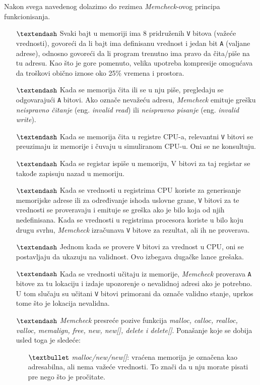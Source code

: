 \documentclass[12pt,oneside]{memoir}
\theoremstyle{plain}
\theoremstyle{definition}
\begin{document}
Nakon svega navedenog dolazimo do rezimea \textit{Memcheck}-ovog principa funkcionisanja.
\begin{itemize}
\item[$\textendash$] Svaki bajt u memoriji ima 8 pridruženih \texttt{V} bitova (važeće vrednosti), govoreći da li bajt ima definisanu vrednost i jedan bit \texttt{A} (valjane adrese), odnosno govoreći da li program trenutno ima pravo da čita/piše na tu adresu. Kao što je gore pomenuto, velika upotreba kompresije omogućava da troškovi obično iznose oko 25\% vremena i prostora.
\item[$\textendash$] Kada se memorija čita ili se u nju piše, pregledaju se odgovarajući \texttt{A} bitovi. Ako označe nevažeću adresu, \textit{Memcheck} emituje grešku \textit{neispravno čitanje} (eng. \textit{invalid read}) ili \textit{neispravno pisanje} (eng. \textit{invalid write}).
\item[$\textendash$] Kada se memorija čita u registre CPU-a, relevantni \texttt{V} bitovi se preuzimaju iz memorije i čuvaju u simuliranom CPU-u. Oni se ne konsultuju.
\item[$\textendash$] Kada se registar ispiše u memoriju, V bitovi za taj registar se takođe zapisuju nazad u memoriju.
\item[$\textendash$] Kada se vrednosti u registrima CPU koriste za generisanje memorijske adrese ili za određivanje ishoda uslovne grane, \texttt{V} bitovi za te vrednosti se proveravaju i emituje se greška ako je bilo koja od njih nedefinisana. Kada se vrednosti u registrima procesora koriste u bilo koju drugu svrhu, \textit{Memcheck} izračunava \texttt{V} bitove za rezultat, ali ih ne proverava.
\item[$\textendash$] Jednom kada se provere \texttt{V} bitovi za vrednost u CPU, oni se postavljaju da ukazuju na validnost. Ovo izbegava dugačke lance grešaka.
\item[$\textendash$] Kada se vrednosti učitaju iz memorije, \textit{Memcheck} proverava \texttt{A} bitove za tu lokaciju i izdaje upozorenje o nevalidnoj adresi ako je potrebno. U tom slučaju su učitani \texttt{V} bitovi primorani da označe validno stanje, uprkos tome što je lokacija nevalidna. 
\item[$\textendash$] \textit{Memcheck} presreće pozive funkcija \textit{malloc, calloc, realloc, valloc, memalign, free, new, new[], delete i delete[]}. Ponašanje koje  se dobija usled toga je sledeće:
	\begin{itemize}
	\item[$\textbullet$] \textit{malloc/new/new[]}: vraćena memorija je označena kao adresabilna, ali nema važeće vrednosti. To znači da u nju morate pisati pre nego što je pročitate.

\end{itemize}
\end{itemize}
\end{document}
